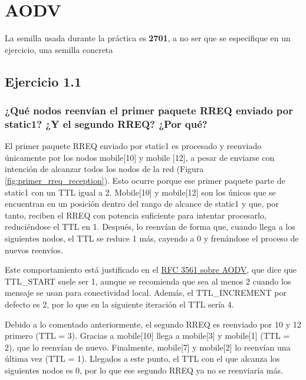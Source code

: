 \chapter{AODV}
\label{chap:aodv}

\vspace{-0.5cm}
\tcolorbox[colback=yellow!20, colframe=yellow!75!black, title=Nota]
La semilla usada durante la práctica es \textbf{2701}, a no ser que se especifique en un ejercicio, una semilla concreta 
\endtcolorbox
\vspace{1cm}

\section{Ejercicio 1.1}

\subsection{¿Qué nodos reenvían el primer paquete RREQ enviado por static1? ¿Y el segundo RREQ? ¿Por qué?}

El primer paquete RREQ enviado por static1 es procesado y reenviado únicamente por los nodos mobile[10] y mobile [12], a pesar de enviarse con intención de alcanzar todos los nodos de la red (Figura \ref{fig:primer_rreq_reception}). Esto ocurre porque ese primer paquete parte de static1 con un TTL igual a 2. Mobile[10] y mobile[12] son los únicos que se encuentran en un posición dentro del rango de alcance de static1 y que, por tanto, reciben el RREQ con potencia suficiente para intentar procesarlo, reduciéndose el TTL en 1. Después, lo reenvían de forma que, cuando llega a los siguientes nodos, el TTL se reduce 1 más, cayendo a 0 y frenándose el proceso de nuevos reenvíos.

Este comportamiento está justificado en el \href{https://datatracker.ietf.org/doc/html/rfc3561}{RFC 3561 sobre AODV}, que dice que TTL\_START suele ser 1, aunque se recomienda que sea al menos 2 cuando los mensaje se usan para conectividad local. Además, el TTL\_INCREMENT por defecto es 2, por lo que en la siguiente iteración el TTL sería 4.

Debido a lo comentado anteriormente, el segundo RREQ es reenviado por 10 y 12 primero (TTL = 3). Gracias a mobile[10] llega a mobile[3] y mobile[1] (TTL = 2), que lo reenvían de nuevo. Finalmente, mobile[7] y mobile[2] lo reenvían una última vez (TTL = 1). Llegados a este punto, el TTL con el que alcanza los siguientes nodos es 0, por lo que ese segundo RREQ ya no se reenviaría más.

